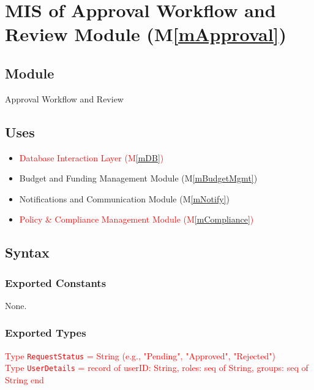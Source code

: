 \documentclass[12pt, titlepage]{article}
\providecommand{\mref}[1]{M\ref{#1}}
\begin{document}
\section{MIS of Approval Workflow and Review Module (\mref{mApproval})}

\subsection{Module}
Approval Workflow and Review

\subsection{Uses}
\begin{itemize}
    \item \textcolor{red}{Database Interaction Layer (\mref{mDB})}
    \item Budget and Funding Management Module (\mref{mBudgetMgmt})
    \item Notifications and Communication Module (\mref{mNotify})
    \item \textcolor{red}{Policy \& Compliance Management Module (\mref{mCompliance})} %
\end{itemize}

\subsection{Syntax}
\subsubsection{Exported Constants}
None.

\subsubsection{Exported Types} %
\textcolor{red}{Type \texttt{RequestStatus} = String (e.g., "Pending", "Approved", "Rejected")} \\
\textcolor{red}{Type \texttt{UserDetails} = record of userID: String, roles: seq of String, groups: seq of String end}
\end{document}
